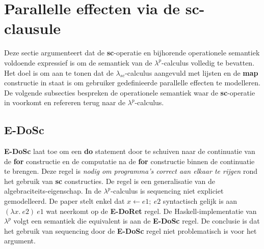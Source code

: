 \section{Parallelle effecten via de sc-clausule}
Deze sectie argumenteert dat de \textbf{sc}-operatie en bijhorende operationele semantiek voldoende expressief is om de semantiek van de $\lambda^p$-calculus volledig te bevatten. Het doel is om aan te tonen dat de $\lambda_{sc}$-calculus aangevuld met lijsten en de \textbf{map} constructie in staat is om gebruiker gedefinieerde parallelle effecten te modelleren. De volgende subsecties bespreken de operationele semantiek waar de \textbf{sc}-operatie in voorkomt en refereren terug naar de $\lambda^p$-calculus.

\subsection{E-DoSc}
\textbf{E-DoSc} laat toe om een \textbf{do} statement door te schuiven naar de continuatie van de \textbf{for} constructie en de computatie na de \textbf{for} constructie binnen de continuatie te brengen. Deze regel is \emph{nodig om programma's correct aan elkaar te rijgen} rond het gebruik van \textbf{sc} constructies. De regel is een generalisatie van de algebraciteits-eigenschap. In de $\lambda^p$-calculus is sequencing niet expliciet gemodelleerd. De paper stelt enkel dat $x \leftarrow e1; \ e2$ syntactisch gelijk is aan $(\lambda x. \ e2 ) \ e1$ wat neerkomt op de \textbf{E-DoRet} regel. De Haskell-implementatie van $\lambda^p$ volgt een semantiek die equivalent is aan de \textbf{E-DoSc} regel. De conclusie is dat het gebruik van sequencing door de \textbf{E-DoSc} regel niet problematisch is voor het argument. 

